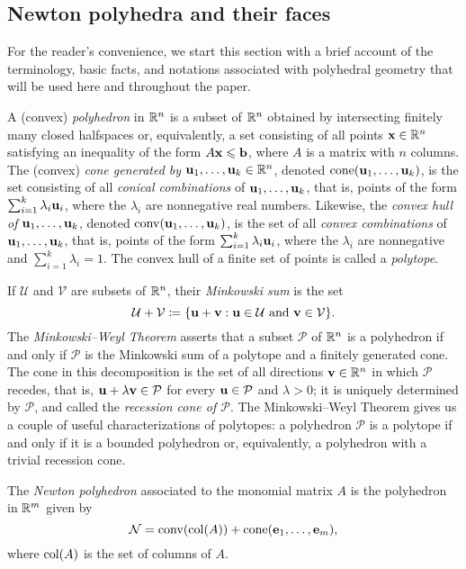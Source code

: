 \documentclass{amsart}
\begin{document}
\subsection{Newton polyhedra and their faces}

For the reader's convenience, we start this section with a brief account of the terminology, basic facts, and notations associated with polyhedral geometry that will be used here and throughout the paper.

A (convex) \emph{polyhedron} in $\mathbb{R}^n$ is a subset of $\mathbb{R}^n$ obtained by intersecting finitely many closed halfspaces or, equivalently, a set consisting of all points $\mathbf{x}\in \mathbb{R}^n$ satisfying an inequality of the form $A\mathbf{x}\leqslant \mathbf{b}$, where $A$ is a matrix with $n$ columns.
The (convex) \emph{cone generated by $\mathbf{u}_1,\ldots,\mathbf{u}_k \in \mathbb{R}^n$}, denoted $\operatorname{cone}(\mathbf{u}_1,\ldots,\mathbf{u}_k)$, is the set consisting of all \emph{conical combinations} of $\mathbf{u}_1, \ldots, \mathbf{u}_k$, that is, points of the form $\sum_{i=1}^k \lambda_i \mathbf{u}_i$, where the $\lambda_i$ are nonnegative real numbers.
Likewise, the \emph{convex hull of $\mathbf{u}_1,\ldots,\mathbf{u}_k$}, denoted $\operatorname{conv}(\mathbf{u}_1,\ldots,\mathbf{u}_k)$, is the set of all \emph{convex combinations} of $\mathbf{u}_1, \ldots, \mathbf{u}_k$, that is, points of the form $\sum_{i=1}^k \lambda_i \mathbf{u}_i$, where the $\lambda_i$ are nonnegative and $\sum_{i=1}^k \lambda_i = 1$.
The convex hull of a finite set of points is called a \emph{polytope}.

If $\mathcal{U}$ and $\mathcal{V}$ are subsets of $\mathbb{R}^n$, their \emph{Minkowski sum} is the set
\[\mathcal{U}+\mathcal{V} \coloneqq \{\mathbf{u}+\mathbf{v}: \mathbf{u}\in \mathcal{U}\text{ and }\mathbf{v}\in \mathcal{V}\}.\]
The \emph{Minkowski--Weyl Theorem} asserts that a subset $\mathcal{P}$ of $\mathbb{R}^n$ is a polyhedron if and only if $\mathcal{P}$ is the Minkowski sum of a polytope and a finitely generated cone.
The cone in this decomposition is the set of all directions $\mathbf{v} \in \mathbb{R}^n$ in which $\mathcal{P}$ recedes, that is, $\mathbf{u} + \lambda \mathbf{v} \in \mathcal{P}$ for every $\mathbf{u} \in \mathcal{P}$ and $\lambda > 0$; it is uniquely determined by $\mathcal{P}$, and called the \emph{recession cone of $\mathcal{P}$}.
The Minkowski--Weyl Theorem gives us a couple of useful characterizations of polytopes: a polyhedron $\mathcal{P}$ is a polytope if and only if it is a bounded polyhedron or, equivalently, a polyhedron with a trivial recession cone.

\begin{definition}
The \emph{Newton polyhedron} associated to the monomial matrix $A$ is the polyhedron in $\mathbb{R}^m$ given by
\[ \mathcal{N} = \operatorname{conv}( \operatorname{col}(A) ) + \operatorname{cone}( \mathbf{e}_1, \ldots, \mathbf{e}_m), \]
where $\operatorname{col}(A)$ is the set of columns of $A$.
\end{definition}
\end{document}
